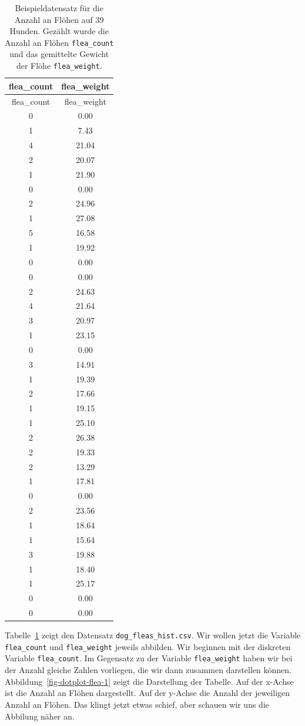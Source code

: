 \documentclass[
  letterpaper,
]{scrbook}
\begin{document}
\hypertarget{tbl-cat-dog-histogram}{}
\begin{longtable}[]{@{}cc@{}}
\caption{\label{tbl-cat-dog-histogram}Beispieldatensatz für die Anzahl
an Flöhen auf 39 Hunden. Gezählt wurde die Anzahl an Flöhen
\texttt{flea\_count} und das gemittelte Gewicht der Flöhe
\texttt{flea\_weight}.}\tabularnewline
\toprule()
flea\_count & flea\_weight \\
\midrule()
\endfirsthead
\toprule()
flea\_count & flea\_weight \\
\midrule()
\endhead
0 & 0.00 \\
1 & 7.43 \\
4 & 21.04 \\
2 & 20.07 \\
1 & 21.90 \\
0 & 0.00 \\
2 & 24.96 \\
1 & 27.08 \\
5 & 16.58 \\
1 & 19.92 \\
0 & 0.00 \\
0 & 0.00 \\
2 & 24.63 \\
4 & 21.64 \\
3 & 20.97 \\
1 & 23.15 \\
0 & 0.00 \\
3 & 14.91 \\
1 & 19.39 \\
2 & 17.66 \\
1 & 19.15 \\
1 & 25.10 \\
2 & 26.38 \\
2 & 19.33 \\
2 & 13.29 \\
1 & 17.81 \\
0 & 0.00 \\
2 & 23.56 \\
1 & 18.64 \\
1 & 15.64 \\
3 & 19.88 \\
1 & 18.40 \\
1 & 25.17 \\
0 & 0.00 \\
0 & 0.00 \\
\bottomrule()
\end{longtable}

Tabelle~\ref{tbl-cat-dog-histogram} zeigt den Datensatz
\texttt{dog\_fleas\_hist.csv}. Wir wollen jetzt die Variable
\texttt{flea\_count} und \texttt{flea\_weight} jeweils abbilden. Wir
beginnen mit der diskreten Variable \texttt{flea\_count}. Im Gegensatz
zu der Variable \texttt{flea\_weight} haben wir bei der Anzahl gleiche
Zahlen vorliegen, die wir dann zusammen darstellen können.
Abbildung~\ref{fig-dotplot-flea-1} zeigt die Darstellung der Tabelle.
Auf der x-Achse ist die Anzahl an Flöhen dargestellt. Auf der y-Achse
die Anzahl der jeweiligen Anzahl an Flöhen. Das klingt jetzt etwas
schief, aber schauen wir uns die Abbilung näher an.
\end{document}
